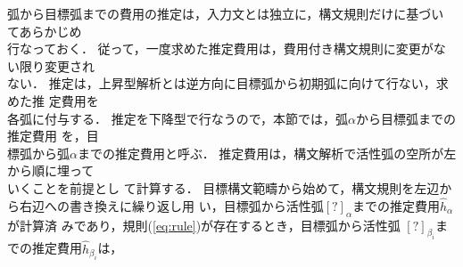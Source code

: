 弧から目標弧までの費用の推定は，入力文とは独立に，構文規則だけに基づい
てあらかじめ\\行なっておく．
\hspace*{0.1mm}従って，\hspace*{0.1mm}一\hspace*{0.1mm}度\hspace*{0.1mm}求めた推\hspace*{0.1mm}定\hspace*{0.1mm}費\hspace*{0.1mm}用は，\hspace*{0.1mm}費\hspace*{0.1mm}用\hspace*{0.1mm}付き構\hspace*{0.1mm}文\hspace*{0.1mm}規\hspace*{0.1mm}則に変\hspace*{0.1mm}更がない限り変\hspace*{0.1mm}更され\\
ない．\hspace*{0.1mm}
推\hspace*{0.1mm}定は，上\hspace*{0.1mm}昇\hspace*{0.1mm}型\hspace*{0.1mm}解\hspace*{0.1mm}析とは逆\hspace*{0.1mm}方\hspace*{0.1mm}向に目\hspace*{0.1mm}標\hspace*{0.1mm}弧から初\hspace*{0.1mm}期\hspace*{0.1mm}弧に向けて行ない，\hspace*{0.1mm}求めた推
\hspace*{0.1mm}定\hspace*{0.1mm}費\hspace*{0.1mm}用を\\各弧に付与する．
推定を下降型で行なうので，本節では，弧$\alpha$から目標弧までの推定費用
を，目\\標弧から弧$\alpha$までの推定費用と呼ぶ．
推定費用は，構文解析で活性弧の空所が左から順に埋って\\いくことを前提とし
て計算する．
目標構文範疇から始めて，構文規則を左辺から右辺への書き換えに繰り返し用
い，目標弧から活性弧$[?]_\alpha$までの推定費用$\hat{h}_\alpha$が計算済
みであり，規則(\ref{eq:rule})が存在するとき，目標弧から活性弧
$[?]_{\beta_i}$までの推定費用$\hat{h}_{\beta_i}$は，
